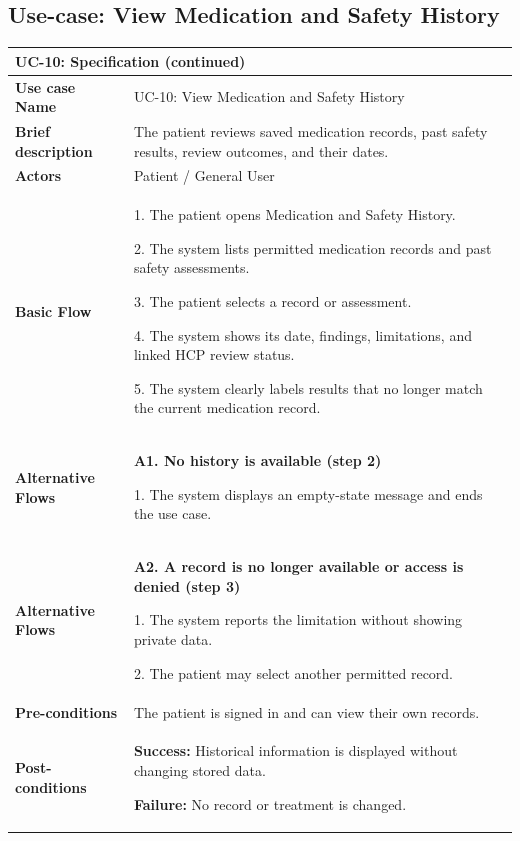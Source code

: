 \subsection{Use-case: View Medication and Safety History}
\label{uc:uc-10}
\begin{longtable}{|p{}|p{}|}
\hline
\endfirsthead
\multicolumn{2}{l}{\textbf{UC-10: Specification (continued)}} \\
\hline
\endhead
\textbf{Use case Name} & UC-10: View Medication and Safety History \\ \hline
\textbf{Brief description} & The patient reviews saved medication records, past safety results, review outcomes, and their dates. \\ \hline
\textbf{Actors} & Patient / General User \\ \hline
\textbf{Basic Flow} &
1. The patient opens Medication and Safety History.\par
2. The system lists permitted medication records and past safety assessments.\par
3. The patient selects a record or assessment.\par
4. The system shows its date, findings, limitations, and linked HCP review status.\par
5. The system clearly labels results that no longer match the current medication record.
\\ \hline
\textbf{Alternative Flows} &
\textbf{A1. No history is available (step 2)}\par
1. The system displays an empty-state message and ends the use case.
\\ \hline
\textbf{Alternative Flows} &
\textbf{A2. A record is no longer available or access is denied (step 3)}\par
1. The system reports the limitation without showing private data.\par
2. The patient may select another permitted record.
\\ \hline
\textbf{Pre-conditions} & The patient is signed in and can view their own records. \\ \hline
\textbf{Post-conditions} & \textbf{Success:} Historical information is displayed without changing stored data.\par
\textbf{Failure:} No record or treatment is changed. \\ \hline
\end{longtable}
\clearpage
